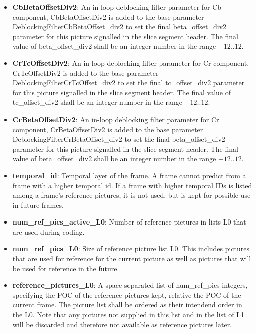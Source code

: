 \documentclass[a4paper,11pt]{jvetdoc}
\begin{document}
\begin{itemize}
\item[]\textbf{CbBetaOffsetDiv2}: An in-loop deblocking filter parameter for Cb component, CbBetaOffsetDiv2 
is added to the base parameter DeblockingFilterCbBetaOffset_div2 to set the final beta_offset_div2 
parameter for this picture signalled in the slice segment header. The final 
value of beta_offset_div2 shall be an integer number in the range $-12..12$.

\item[]\textbf{CrTcOffsetDiv2}: An in-loop deblocking filter parameter for Cr component, CrTcOffsetDiv2 
is added to the base parameter DeblockingFilterCrTcOffset_div2 to set the final tc_offset_div2 
parameter for this picture signalled in the slice segment header. The final 
value of tc_offset_div2 shall be an integer number in the range $-12..12$.

\item[]\textbf{CrBetaOffsetDiv2}: An in-loop deblocking filter parameter for Cr component, CrBetaOffsetDiv2 
is added to the base parameter DeblockingFilterCrBetaOffset_div2 to set the final beta_offset_div2 
parameter for this picture signalled in the slice segment header. The final 
value of beta_offset_div2 shall be an integer number in the range $-12..12$.

\item[]\textbf{temporal_id}: Temporal layer of the frame. A frame cannot
predict from a frame with a higher temporal id. If a frame with higher
temporal IDs is listed among a frame's reference pictures, it is
not used, but is kept for possible use in future frames.

\item[]\textbf{num_ref_pics_active_L0}: Number of reference pictures in lists L0
that are used during coding.

\item[]\textbf{num_ref_pics_L0}: Size of reference picture list L0.
This includes pictures that are used for reference for the
current picture as well as pictures that will be used for reference in
the future.

\item[]\textbf{reference_pictures_L0}: A space-separated list of
num_ref_pics integers, specifying the POC of the reference pictures
kept, relative the POC of the current frame. The picture list shall be
ordered as their intendend order in the L0.
Note that any pictures not supplied in this list and in the list of L1 will be discarded and
therefore not available as reference pictures later.


\end{itemize}
\end{document}
